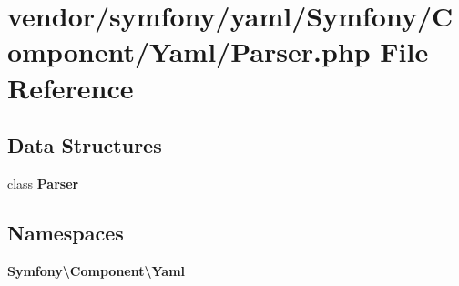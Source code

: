 \section{vendor/symfony/yaml/\+Symfony/\+Component/\+Yaml/\+Parser.php File Reference}
\label{symfony_2yaml_2_symfony_2_component_2_yaml_2_parser_8php}
\subsection*{Data Structures}
\begin{DoxyCompactItemize}
\item 
class {\bf Parser}
\end{DoxyCompactItemize}
\subsection*{Namespaces}
\begin{DoxyCompactItemize}
\item 
 {\bf Symfony\textbackslash{}\+Component\textbackslash{}\+Yaml}
\end{DoxyCompactItemize}
